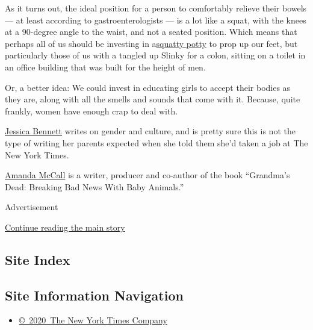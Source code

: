 As it turns out, the ideal position for a person to comfortably relieve
their bowels --- at least according to gastroenterologists --- is a lot
like a squat, with the knees at a 90-degree angle to the waist, and not
a seated position. Which means that perhaps all of us should be
investing in
a\href{https://www.theguardian.com/news/2018/nov/30/bowel-movement-change-the-way-you-poo-squatty-potty-toilet?CMP=Share_iOSApp_Other}{squatty
potty} to prop up our feet, but particularly those of us with a tangled
up Slinky for a colon, sitting on a toilet in an office building that
was built for the height of men.

Or, a better idea: We could invest in educating girls to accept their
bodies as they are, along with all the smells and sounds that come with
it. Because, quite frankly, women have enough crap to deal with.

\href{http://jessicabennett.com/}{Jessica Bennett} writes on gender and
culture, and is pretty sure this is not the type of writing her parents
expected when she told them she'd taken a job at The New York Times.

\href{https://amandacmccall.com/}{Amanda McCall} is a writer, producer
and co-author of the book ``Grandma's Dead: Breaking Bad News With Baby
Animals.''

Advertisement

\protect\hyperlink{after-bottom}{Continue reading the main story}

\hypertarget{site-index}{%
\subsection{Site Index}\label{site-index}}

\hypertarget{site-information-navigation}{%
\subsection{Site Information
Navigation}\label{site-information-navigation}}

\begin{itemize}
\tightlist
\item
  \href{https://help.nytimes.com/hc/en-us/articles/115014792127-Copyright-notice}{©~2020~The
  New York Times Company}
\end{itemize}

